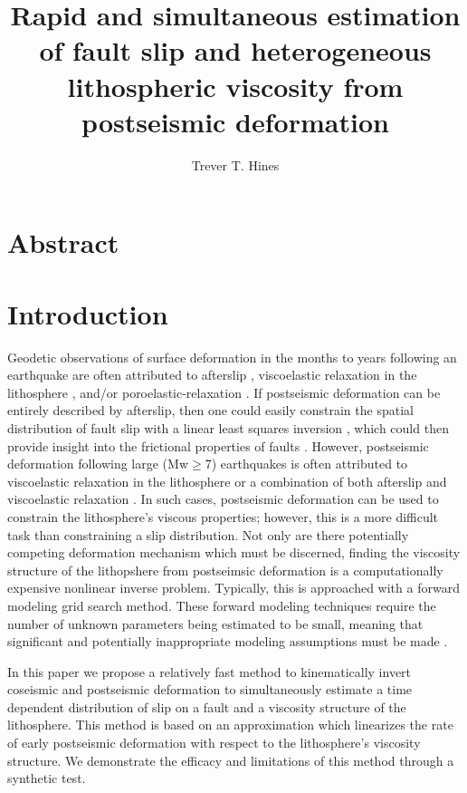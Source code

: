 \documentclass[12pt]{article}
\begin{document}
\title{Rapid and simultaneous estimation of fault slip and
  heterogeneous lithospheric viscosity from postseismic deformation}
\author{Trever T. Hines} \maketitle
\section{Abstract}

\section{Introduction}
Geodetic observations of surface deformation in the months to years
following an earthquake are often attributed to afterslip
\citep[e.g.][]{M1991}, viscoelastic relaxation in the lithosphere
\citep[e.g.][]{NM1974}, and/or poroelastic-relaxation
\citep[e.g.][]{P1998,J2003}.  If postseismic deformation can be entirely
described by afterslip, then one could easily constrain the spatial
distribution of fault slip with a linear least squares inversion
\citep[e.g.][]{F2007,B2002,H1987}, which could then provide insight into the
frictional properties of faults \citep[e.g.][]{B2009}.  However,
postseismic deformation following large (Mw$\geq$7) earthquakes is
often attributed to viscoelastic relaxation in the lithosphere
\citep[e.g.][]{P2003} or a combination of both afterslip and viscoelastic
relaxation \citep[e.g.][]{H2008,R2015}.  In such cases, postseismic
deformation can be used to constrain the lithosphere's viscous
properties; however, this is a more difficult task than constraining a
slip distribution.  Not only are there potentially competing
deformation mechanism which must be discerned, finding the viscosity
structure of the lithopshere from postseimsic deformation is a
computationally expensive nonlinear inverse problem.  Typically, this
is approached with a forward modeling grid search method.  These
forward modeling techniques require the number of unknown parameters
being estimated to be small, meaning that significant and potentially
inappropriate modeling assumptions must be made \citep{H2013,RG2008}.

In this paper we propose a relatively fast method to kinematically
invert coseismic and postseismic deformation to simultaneously
estimate a time dependent distribution of slip on a fault and a
viscosity structure of the lithosphere.  This method is based on an
approximation which linearizes the rate of early postseismic
deformation with respect to the lithosphere's viscosity structure.  We
demonstrate the efficacy and limitations of this method through a
synthetic test.
\end{document}
